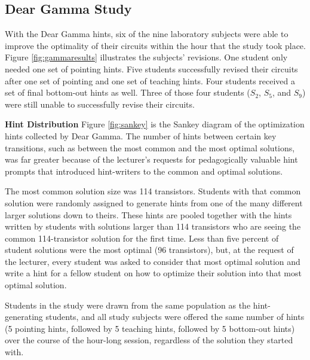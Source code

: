 \subsection{Dear Gamma Study}

With the Dear Gamma hints, six of the nine laboratory subjects were able to improve the optimality of their circuits within the hour that the study took place. Figure \ref{fig:gammaresults} illustrates the subjects' revisions. One student only needed one set of pointing hints. Five students successfully revised their circuits after one set of pointing and one set of teaching hints. Four students received a set of final bottom-out hints as well. Three of those four students ($S_2$, $S_5$, and $S_9$) were still unable to successfully revise their circuits. 

{\bf Hint Distribution} Figure \ref{fig:sankey} is the Sankey diagram of the optimization hints collected by Dear Gamma. The number of hints between certain key transitions, such as between the most common and the most optimal solutions, was far greater because of the lecturer's requests for pedagogically valuable hint prompts that introduced hint-writers to the common and optimal solutions. 

The most common solution size was 114 transistors. Students with that common solution were randomly assigned to generate hints from one of the many different larger solutions down to theirs. These hints are pooled together with the hints written by students with solutions larger than 114 transistors who are seeing the common 114-transistor solution for the first time. Less than five percent of student solutions were the most optimal (96 transistors), but, at the request of the lecturer, every student was asked to consider that most optimal solution and write a hint for a fellow student on how to optimize their solution into that most optimal solution.

Students in the study were drawn from the same population as the hint-generating students, and all study subjects were offered the same number of hints (5 pointing hints, followed by 5 teaching hints, followed by 5 bottom-out hints) over the course of the hour-long session, regardless of the solution they started with. 

